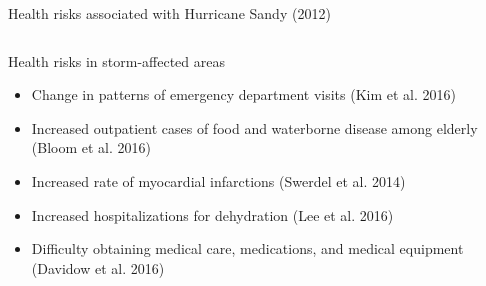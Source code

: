 \documentclass[ignorenonframetext,]{beamer}
\begin{document}
\begin{frame}{Health risks associated with Hurricane Sandy (2012)}
\begin{columns}
\begin{column}{0.55\textwidth}
\small
\begin{block}{Health risks in storm-affected areas}
\begin{itemize}
  \item Change in patterns of emergency department visits (Kim et al. 2016)
  \item Increased outpatient cases of food and waterborne disease among elderly (Bloom et al. 2016)
  \item Increased rate of myocardial infarctions (Swerdel et al. 2014)
  \item Increased hospitalizations for dehydration (Lee et al. 2016)
  \item Difficulty obtaining medical care, medications, and medical equipment (Davidow et al. 2016)
\end{itemize}
\end{block}
\end{column}

\end{columns}

\end{frame}
\end{document}
